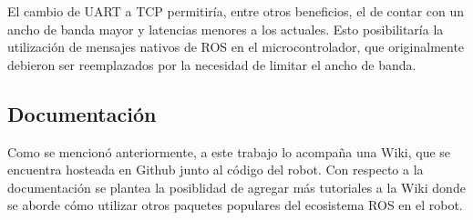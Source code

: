 El cambio de UART a TCP permitiría, entre otros beneficios, el de contar con un ancho de banda mayor y latencias menores a los actuales. Esto posibilitaría la utilización de mensajes nativos de ROS en el microcontrolador, que originalmente debieron ser reemplazados por la necesidad de limitar el ancho de banda.

\subsection{Documentación}

Como se mencionó anteriormente, a este trabajo lo acompaña una Wiki, que se encuentra hosteada en Github junto al código del robot. Con respecto a la documentación se plantea la posiblidad de agregar más tutoriales a la Wiki donde se aborde cómo utilizar otros paquetes populares del ecosistema ROS en el robot.